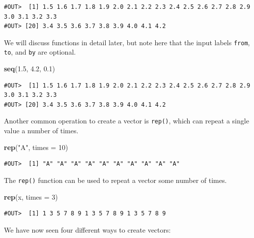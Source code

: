 \documentclass[]{book}
\newenvironment{Shaded}{\begin{snugshade}}{\end{snugshade}}
\newcommand{\KeywordTok}[1]{\textcolor[rgb]{0.13,0.29,0.53}{\textbf{#1}}}
\newcommand{\DataTypeTok}[1]{\textcolor[rgb]{0.13,0.29,0.53}{#1}}
\newcommand{\DecValTok}[1]{\textcolor[rgb]{0.00,0.00,0.81}{#1}}
\newcommand{\FloatTok}[1]{\textcolor[rgb]{0.00,0.00,0.81}{#1}}
\newcommand{\StringTok}[1]{\textcolor[rgb]{0.31,0.60,0.02}{#1}}
\newcommand{\NormalTok}[1]{#1}
\begin{document}
\begin{verbatim}
#OUT>  [1] 1.5 1.6 1.7 1.8 1.9 2.0 2.1 2.2 2.3 2.4 2.5 2.6 2.7 2.8 2.9 3.0 3.1 3.2 3.3
#OUT> [20] 3.4 3.5 3.6 3.7 3.8 3.9 4.0 4.1 4.2
\end{verbatim}

We will discuss functions in detail later, but note here that the input
labels \texttt{from}, \texttt{to}, and \texttt{by} are optional.

\begin{Shaded}
\begin{Highlighting}[]
\KeywordTok{seq}\NormalTok{(}\FloatTok{1.5}\NormalTok{, }\FloatTok{4.2}\NormalTok{, }\FloatTok{0.1}\NormalTok{)}
\end{Highlighting}
\end{Shaded}

\begin{verbatim}
#OUT>  [1] 1.5 1.6 1.7 1.8 1.9 2.0 2.1 2.2 2.3 2.4 2.5 2.6 2.7 2.8 2.9 3.0 3.1 3.2 3.3
#OUT> [20] 3.4 3.5 3.6 3.7 3.8 3.9 4.0 4.1 4.2
\end{verbatim}

Another common operation to create a vector is \texttt{rep()}, which can
repeat a single value a number of times.

\begin{Shaded}
\begin{Highlighting}[]
\KeywordTok{rep}\NormalTok{(}\StringTok{"A"}\NormalTok{, }\DataTypeTok{times =} \DecValTok{10}\NormalTok{)}
\end{Highlighting}
\end{Shaded}

\begin{verbatim}
#OUT>  [1] "A" "A" "A" "A" "A" "A" "A" "A" "A" "A"
\end{verbatim}

The \texttt{rep()} function can be used to repeat a vector some number
of times.

\begin{Shaded}
\begin{Highlighting}[]
\KeywordTok{rep}\NormalTok{(x, }\DataTypeTok{times =} \DecValTok{3}\NormalTok{)}
\end{Highlighting}
\end{Shaded}

\begin{verbatim}
#OUT>  [1] 1 3 5 7 8 9 1 3 5 7 8 9 1 3 5 7 8 9
\end{verbatim}

We have now seen four different ways to create vectors:
\end{document}
